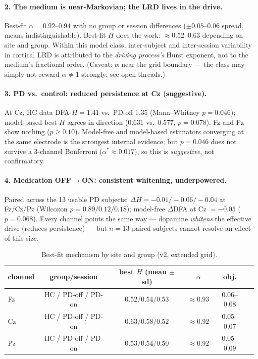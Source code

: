 \documentclass[11pt]{article}
\begin{document}
\paragraph{2. The medium is near-Markovian; the LRD lives in the drive.}
Best-fit $\alpha = 0.92$--$0.94$ with no group or session differences
($\pm 0.05$--$0.06$ spread, means indistinguishable). Best-fit $H$ does the
work: $\approx 0.52$--$0.63$ depending on site and group. Within this model
class, inter-subject and inter-session variability in cortical LRD is
attributed to the \emph{driving process's} Hurst exponent, not to the
medium's fractional order. (Caveat: $\alpha$ near the grid boundary --- the
class may simply not reward $\alpha \neq 1$ strongly; see open threads.)

\paragraph{3. PD vs.\ control: reduced persistence at Cz (suggestive).}
At Cz, HC data DFA-$H = 1.41$ vs.\ PD-off $1.35$ (Mann--Whitney
$p = 0.046$); model-based best-$H$ agrees in direction ($0.631$ vs.\ $0.577$,
$p = 0.078$). Fz and Pz show nothing ($p \geq 0.10$). Model-free and
model-based estimators converging at the same electrode is the strongest
internal evidence; but $p = 0.046$ does not survive a 3-channel Bonferroni
($\alpha^\ast \approx 0.017$), so this is \emph{suggestive}, not
confirmatory.

\paragraph{4. Medication OFF$\to$ON: consistent whitening, underpowered.}
Paired across the 13 usable PD subjects: $\Delta H = -0.01 / -0.06 / -0.04$
at Fz/Cz/Pz (Wilcoxon $p = 0.89 / 0.12 / 0.18$); model-free $\Delta$DFA at
Cz $= -0.05$ ($p = 0.068$). Every channel points the same way --- dopamine
\emph{whitens} the effective drive (reduces persistence) --- but $n = 13$
paired subjects cannot resolve an effect of this size.

\begin{table}[h]
\centering\small
\begin{tabular}{lccccl}
\toprule
channel & group/session & best $H$ (mean $\pm$ sd) & $\alpha$ & obj. \\
\midrule
Fz & HC / PD-off / PD-on & $0.52 / 0.54 / 0.53$ & $\approx 0.93$ & 0.06--0.08 \\
Cz & HC / PD-off / PD-on & $0.63 / 0.58 / 0.52$ & $\approx 0.92$ & 0.05--0.07 \\
Pz & HC / PD-off / PD-on & $0.53 / 0.54 / 0.50$ & $\approx 0.92$ & 0.05--0.09 \\
\bottomrule
\end{tabular}
\caption{Best-fit mechanism by site and group (v2, extended grid).}
\end{table}
\end{document}
